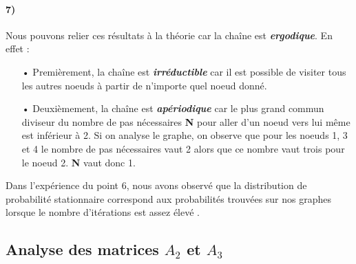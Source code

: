 \documentclass[a4paper,titlepage]{report}
\begin{document}
\paragraph{7)} 
Nous pouvons relier ces résultats à la théorie car la chaîne est \textbf{\textit{ergodique}}. En effet : \\
\begin{itemize}
\item[•] Premièrement, la chaîne est \textbf{\textit{irréductible}} car il est possible de visiter tous les autres noeuds à partir de n'importe quel noeud donné.
\item[•] Deuxièmement, la chaîne est \textbf{\textit{apériodique}} car le plus grand commun diviseur du nombre de pas nécessaires \textbf{N} pour aller d'un noeud vers lui même est inférieur à 2. Si on analyse le graphe, on observe que pour les noeuds 1, 3 et 4 le nombre de pas nécessaires vaut 2 alors que ce nombre vaut trois pour le noeud 2. \textbf{N} vaut donc 1.\\
\end{itemize}

Dans l'expérience du point 6, nous avons observé que la distribution de probabilité stationnaire correspond aux probabilités trouvées sur nos graphes lorsque le nombre d'itérations est assez élevé .


\subsection{Analyse des matrices $A_2$ et $A_3$}
\end{document}
